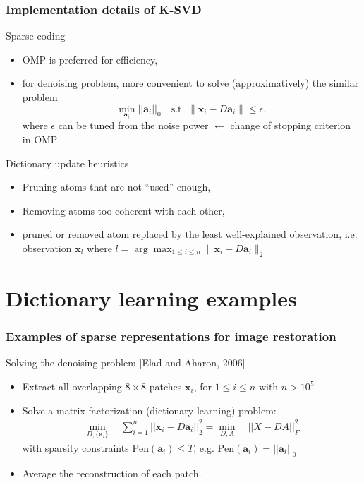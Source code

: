 \documentclass[compress, smaller, serif, 9pt]{beamer}
\newcommand{\structuretext}[1]{{\usebeamercolor[fg]{structure} #1}}
\newcommand{\doigt}{\structuretext{\noindent \Pisymbol{pzd}{43}}}
\newcommand{\bx}{{\boldsymbol{x}}}
\newcommand{\bX}{{X}}
\newcommand{\bD}{{D}}
\newcommand{\ba}{{\boldsymbol{a}}}
\newcommand{\bAl}{A}
\begin{document}
\begin{frame}
  \frametitle{Implementation details of K-SVD}
  
  
  \begin{block}{Sparse coding}
  \begin{itemize}
   \item OMP is preferred for efficiency, 
   \item for denoising problem, more convenient to solve (approximatively) the similar problem 
   $$ \min_{\ba_i} ||\ba_i||_0 \quad \textrm{s.t. } \| \bx_i-\bD\ba_i\| \le \epsilon,$$
    where $\epsilon$ can be tuned from the noise power $\leftarrow$ change of stopping criterion in OMP
  \end{itemize}
 
  \end{block}
  
  \begin{block}{Dictionary update heuristics}
  \begin{itemize}
  \item Pruning atoms that are not ``used'' enough,
  \item Removing atoms too coherent with each other,
  \item[\doigt] pruned or removed atom replaced by the least well-explained observation, i.e. observation
  $\bx_{l}$ where $l= \arg \max_{1\le i \le n } \| \bx_i - \bD \ba_i \|_2$
  \end{itemize}
  \end{block}
  
\end{frame}

\section{Dictionary learning examples}

\begin{frame}
  \frametitle{Examples of sparse representations for image restoration}
  \begin{block}{Solving the denoising problem [Elad and Aharon, 2006]}
  \begin{itemize}
   \item Extract all overlapping $8 \times 8$ patches $\bx_i$, for $1\le i \le n$ with $n > 10^5$ 
   \item Solve a matrix factorization (dictionary learning) problem:
   \begin{align*}
    \min_{\bD,\{\ba_i\} } \quad \sum_{i=1}^n || \bx_i - \bD \ba_i||_2^2 = \min_{\bD,\bAl} \quad || \bX - \bD \bAl||_F^2
   \end{align*}
   with \alert{sparsity} constraints $\textrm{Pen}(\ba_i) \le T$, e.g. $\textrm{Pen}(\ba_i)= ||\ba_i||_0$
   \item Average the reconstruction of each patch.
  \end{itemize}
  \end{block}

\end{frame}
\end{document}
